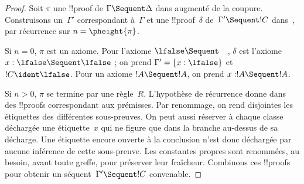 \documentclass[../../../include/open-logic-section]{subfiles}
\begin{document}
\begin{proof}
Soit $\pi$ une !!{proof} de $\Gamma \Sequent \Delta$
dans  augmenté de la coupure. Construisons
un~$\Gamma'$ correspondant à~$\Gamma$ et une
!!{proof}~$\delta$ de~$\Gamma' \Sequent !C$
dans~, par récurrence sur $n = \pheight{\pi}$.

Si $n = 0$, $\pi$ est un axiome. Pour l'axiome
$\lfalse \Sequent \quad$, $\delta$ est l'axiome
$x:\lfalse \Sequent \lfalse$ ; on prend
$\Gamma' = \{x:\lfalse\}$ et $!C \ident \lfalse$.
Pour un axiome $!A \Sequent !A$, on prend
$x: !A \Sequent !A$.

Si $n>0$, $\pi$ se termine par une règle~$R$.
L'hypothèse de récurrence donne dans~
des !!{proof}s correspondant aux prémisses.
Par renommage, on rend disjointes les étiquettes des
différentes sous-preuves. On peut aussi réserver à
chaque classe déchargée une étiquette~$x$ qui ne figure
que dans la branche au-dessus de sa décharge.
Une étiquette encore ouverte à la conclusion n'est
donc déchargée par aucune inférence de cette sous-preuve.
Les constantes propres sont renommées, au besoin,
avant toute greffe, pour préserver leur fraîcheur.
Combinons ces !!{proof}s pour obtenir un
séquent~$\Gamma' \Sequent !C$ convenable.


\end{proof}
\end{document}
